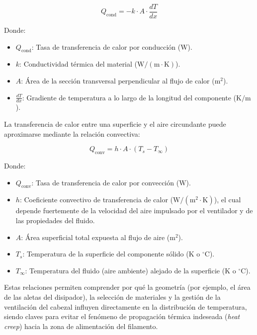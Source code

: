 \begin{equation}
    Q_{\text{cond}} = -k \cdot A \cdot \frac{dT}{dx}
    \label{eq:ley_fourier_hotend}
\end{equation}

Donde:
\begin{itemize}
    \item $Q_{\text{cond}}$: Tasa de transferencia de calor por conducción ($\text{W}$).
    \item $k$: Conductividad térmica del material ($\text{W}/(\text{m}\cdot\text{K})$).
    \item $A$: Área de la sección transversal perpendicular al flujo de calor ($\text{m}^2$).
    \item $\frac{dT}{dx}$: Gradiente de temperatura a lo largo de la longitud del componente ($\text{K/m}$).
\end{itemize}
La transferencia de calor entre una superficie y el aire circundante puede aproximarse mediante la relación convectiva:

\begin{equation}
    Q_{\text{conv}} = h \cdot A \cdot (T_s - T_{\infty})
    \label{eq:transferencia_convectiva}
\end{equation}

Donde:
\begin{itemize}
    \item $Q_{\text{conv}}$: Tasa de transferencia de calor por convección ($\text{W}$).
    \item $h$: Coeficiente convectivo de transferencia de calor ($\text{W}/(\text{m}^2\cdot\text{K})$), el cual depende fuertemente de la velocidad del aire impulsado por el ventilador y de las propiedades del fluido.
    \item $A$: Área superficial total expuesta al flujo de aire ($\text{m}^2$).
    \item $T_s$: Temperatura de la superficie del componente sólido ($\text{K}$ o $^\circ\text{C}$).
    \item $T_{\infty}$: Temperatura del fluido (aire ambiente) alejado de la superficie ($\text{K}$ o $^\circ\text{C}$).
\end{itemize}

Estas relaciones permiten comprender por qué la geometría (por ejemplo, el área de las aletas del disipador), la selección de materiales y la gestión de la ventilación del cabezal influyen directamente en la distribución de temperatura, siendo claves para evitar el fenómeno de propagación térmica indeseada (\textit{heat creep}) hacia la zona de alimentación del filamento.


